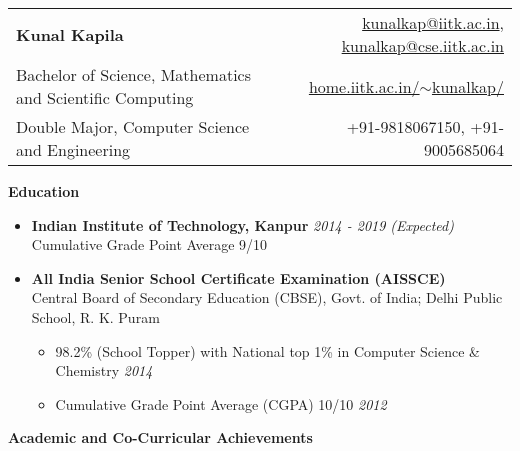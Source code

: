 \documentclass[letterpaper,11pt]{article}
\begin{document}
{\selectfont
\begin{tabular*}{7.5in}{l@{\extracolsep{\fill}}r}
    \textbf{\Large Kunal Kapila} & \href{mailto:kunalkap@iitk.ac.in}{kunalkap@iitk.ac.in},
        \href{mailto:kunalkap@cse.iitk.ac.in}{kunalkap@cse.iitk.ac.in}\\
    Bachelor of Science, Mathematics and Scientific Computing &
        \href{http://home.iitk.ac.in/~kunalkap/}{home.iitk.ac.in/$\sim$kunalkap/}\\
    Double Major, Computer Science and Engineering & +91-9818067150, +91-9005685064\\
    \hline
\end{tabular*}
\vspace{5pt}

\Large{\textbf{Education}}
\small
\vspace{-1pt}
\begin{itemize}
    \item
        \textbf{Indian Institute of Technology, Kanpur} \hfill \textit{2014 - 2019 (Expected)}\\
        Cumulative Grade Point Average 9/10\\
        \vspace{-3pt}
    \item
        \textbf{All India Senior School Certificate Examination (AISSCE)}\\
        Central Board of Secondary Education (CBSE), Govt. of India; Delhi Public School, R. K. Puram\\
        \vspace{-5pt}
        \begin{itemize}
            \item 98.2\% (School Topper) with National top 1\% in Computer Science \& Chemistry \hfill \textit{2014}\\
                \vspace{-2pt}
            \item Cumulative Grade Point Average (CGPA) 10/10 \hfill\textit{2012}\\
                \vspace{-2pt}
        \end{itemize}
\end{itemize}

\vspace{-1pt}
\Large{\textbf{Academic and Co-Curricular Achievements}}
\small
\vspace{-2pt}

}
\end{document}
